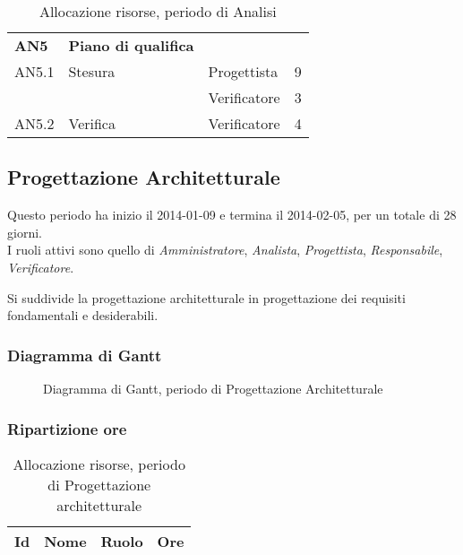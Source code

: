 \begin{table}[H]
\begin{tabular}{ l l l c  }
	\hline
	\textbf{AN5} & \textbf{Piano di qualifica} \\
	\cline{3-4}
	AN5.1 & Stesura & Progettista& 9\\ 
    & & Verificatore & 3 \\
    \cline{3-4}
	AN5.2 & Verifica & Verificatore &  4\\
	
	\hline
	\end{tabular}
	\caption{Allocazione risorse, periodo di Analisi}
	\end{table}

	
	\subsection{Progettazione Architetturale}
	
Questo periodo ha inizio il 2014-01-09 e termina il 2014-02-05, per un totale di 28 giorni. \\
I ruoli attivi sono quello di \textit{Amministratore}, \textit{Analista}, \textit{Progettista}, \textit{Responsabile}, \textit{Verificatore}.

Si suddivide la progettazione architetturale in progettazione dei requisiti fondamentali e desiderabili.

\subsubsection{Diagramma di Gantt}

\begin{figure}[H]
\centering
\scalebox{0.95}{%

	

}
\caption{Diagramma di Gantt, periodo di Progettazione Architetturale}
\end{figure}
	
\subsubsection{Ripartizione ore}
	
	\begin{table}[H]
	\begin{adjustwidth}{-4cm}{-4cm}
	\centering
	\begin{tabular}{ l l l c  }
	\hline
	\multicolumn{1}{c}{\textbf{Id}} & 
	\multicolumn{1}{c}{\textbf{Nome}} & 
	\multicolumn{1}{c}{\textbf{Ruolo}}& 
	\multicolumn{1}{c}{\textbf{Ore}} \\
	\hline
	
		
	
	\end{tabular}
	\caption{Allocazione risorse, periodo di Progettazione architetturale}
	\end{adjustwidth}
	\end{table}
	
